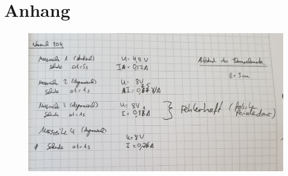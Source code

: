 \section{Anhang}

\begin{figure}[H]
    \centering
    \includegraphics[width=13cm]{content/anhang.jpg}
\end{figure}


  

